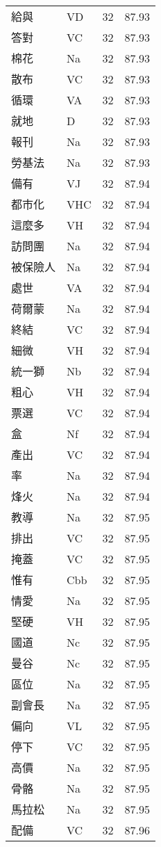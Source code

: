 \documentclass[twocolumn]{book}
\begin{document}
\begin{supertabular}{llrr}
給與 & VD & 32 &  87.93\\
答對 & VC & 32 &  87.93\\
棉花 & Na & 32 &  87.93\\
散布 & VC & 32 &  87.93\\
循環 & VA & 32 &  87.93\\
就地 & D & 32 &  87.93\\
報刊 & Na & 32 &  87.93\\
勞基法 & Na & 32 &  87.93\\
備有 & VJ & 32 &  87.94\\
都市化 & VHC & 32 &  87.94\\
這麼多 & VH & 32 &  87.94\\
訪問團 & Na & 32 &  87.94\\
被保險人 & Na & 32 &  87.94\\
處世 & VA & 32 &  87.94\\
荷爾蒙 & Na & 32 &  87.94\\
終結 & VC & 32 &  87.94\\
細微 & VH & 32 &  87.94\\
統一獅 & Nb & 32 &  87.94\\
粗心 & VH & 32 &  87.94\\
票選 & VC & 32 &  87.94\\
盒 & Nf & 32 &  87.94\\
產出 & VC & 32 &  87.94\\
率 & Na & 32 &  87.94\\
烽火 & Na & 32 &  87.94\\
教導 & Na & 32 &  87.95\\
排出 & VC & 32 &  87.95\\
掩蓋 & VC & 32 &  87.95\\
惟有 & Cbb & 32 &  87.95\\
情愛 & Na & 32 &  87.95\\
堅硬 & VH & 32 &  87.95\\
國道 & Nc & 32 &  87.95\\
曼谷 & Nc & 32 &  87.95\\
區位 & Na & 32 &  87.95\\
副會長 & Na & 32 &  87.95\\
偏向 & VL & 32 &  87.95\\
停下 & VC & 32 &  87.95\\
高價 & Na & 32 &  87.95\\
骨骼 & Na & 32 &  87.95\\
馬拉松 & Na & 32 &  87.95\\
配備 & VC & 32 &  87.96\\

\end{supertabular}
\end{document}
